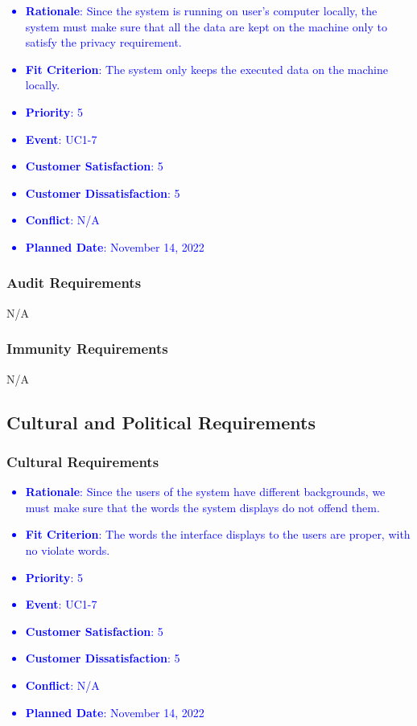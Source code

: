 \documentclass[12pt, titlepage]{article}
\newcounter{reqnum} %
\newcounter{freqnum} %
\begin{document}
\begin{itemize}
\textcolor{blue}{
\item[NFR\refstepcounter{freqnum}\thefreqnum
\label{NFR}:] 
\begin{itemize}
    \item \textbf{Rationale}: Since the system is running on user's computer locally, the system must make sure that all the data are kept on the machine only to satisfy the privacy requirement.
    \item \textbf{Fit Criterion}: The system only keeps the executed data on the machine locally.
    \item \textbf{Priority}: 5
    \item \textbf{Event}: UC1-7%
    \item \textbf{Customer Satisfaction}: 5
    \item \textbf{Customer Dissatisfaction}: 5
    \item \textbf{Conflict}: N/A
    \item \textbf{Planned Date}: November 14, 2022
\end{itemize}
}
\subsubsection{Audit Requirements}
N/A
\subsubsection{Immunity Requirements}
N/A
\subsection{Cultural and Political Requirements}

\subsubsection{Cultural Requirements}
\textcolor{blue}{
\item[NFR\refstepcounter{freqnum}\thefreqnum
\label{NFR}:] 
\begin{itemize}
    \item \textbf{Rationale}: Since the users of the system have different backgrounds, we must make sure that the words the system displays do not offend them.
    \item \textbf{Fit Criterion}: The words the interface displays to the users are proper, with no violate words.
    \item \textbf{Priority}: 5
    \item \textbf{Event}: UC1-7%
    \item \textbf{Customer Satisfaction}: 5
    \item \textbf{Customer Dissatisfaction}: 5
    \item \textbf{Conflict}: N/A
    \item \textbf{Planned Date}: November 14, 2022
\end{itemize}
}


\end{itemize}
\end{document}
